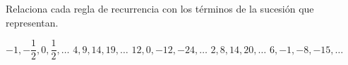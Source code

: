 \question[10] Relaciona cada regla de recurrencia con los términos de la sucesión que representan.

\begin{multicols}{2}
    \begin{choices}
        \choice $-1, -\dfrac{1}{2}, 0, \dfrac{1}{2},\dots $
        \choice $4, 9, 14, 19, \dots$
        \choice $12, 0, -12, -24, \dots$
        \choice $2, 8, 14, 20, \dots$
        \choice $6, -1, -8, -15, \dots$
    \end{choices}
    \columnbreak
\end{multicols}